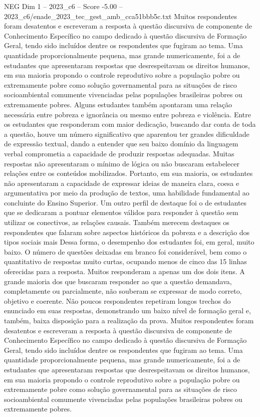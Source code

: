 \begin{textsample}{NEG Dim 1 – 2023\_c6 – Score -5.00 – 2023\_c6/enade\_2023\_tec\_gest\_amb\_cca51bbb5c.txt}
Muitos respondentes foram desatentos e escreveram a resposta à questão discursiva de componente de Conhecimento Específico no campo dedicado à questão discursiva de Formação Geral, tendo sido incluídos dentre os respondentes que fugiram ao tema.
Uma quantidade proporcionalmente pequena, mas grande numericamente, foi a de estudantes que apresentaram respostas que desrespeitavam os direitos humanos, em sua maioria propondo o controle reprodutivo sobre a população pobre ou extremamente pobre como solução governamental para as situações de risco socioambiental comumente vivenciadas pelas populações brasileiras pobres ou extremamente pobres.
Alguns estudantes também apontaram uma relação necessária entre pobreza e ignorância ou mesmo entre pobreza e violência.
Entre os estudantes que responderam com maior dedicação, buscando dar conta de toda a questão, houve um número significativo que aparentou ter grandes dificuldade de expressão textual, dando a entender que seu baixo domínio da linguagem verbal comprometia a capacidade de produzir respostas adequadas.
Muitas respostas não apresentaram o mínimo de lógica ou não buscaram estabelecer relações entre os conteúdos mobilizados.
Portanto, em sua maioria, os estudantes não apresentaram a capacidade de expressar ideias de maneira clara, coesa e argumentativa por meio da produção de textos, uma habilidade fundamental ao concluinte do Ensino Superior.
Um outro perfil de destaque foi o de estudantes que se dedicaram a pontuar elementos válidos para responder à questão sem utilizar os conectivos, as relações causais.
Também merecem destaques os respondentes que falaram sobre aspectos históricos da pobreza e a descrição dos tipos sociais mais Dessa forma, o desempenho dos estudantes foi, em geral, muito baixo.
O número de questões deixadas em branco foi considerável, bem como o quantitativo de respostas muito curtas, ocupando menos de cinco das 15 linhas oferecidas para a resposta.
Muitos responderam a apenas um dos dois itens.
A grande maioria dos que buscaram responder ao que a questão demandava, completamente ou parcialmente, não souberam se expressar de modo correto, objetivo e coerente.
Não poucos respondentes repetiram longos trechos do enunciado em suas respostas, demonstrando um baixo nível de formação geral e, também, baixa disposição para a realização da prova.
Muitos respondentes foram desatentos e escreveram a resposta à questão discursiva de componente de Conhecimento Específico no campo dedicado à questão discursiva de Formação Geral, tendo sido incluídos dentre os respondentes que fugiram ao tema.
Uma quantidade proporcionalmente pequena, mas grande numericamente, foi a de estudantes que apresentaram respostas que desrespeitavam os direitos humanos, em sua maioria propondo o controle reprodutivo sobre a população pobre ou extremamente pobre como solução governamental para as situações de risco socioambiental comumente vivenciadas pelas populações brasileiras pobres ou extremamente pobres.

\end{textsample}

